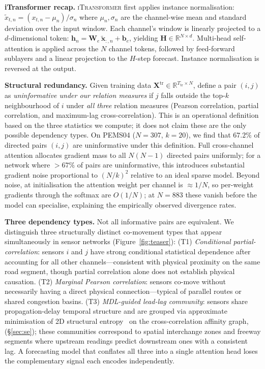 \documentclass[letterpaper]{article}   %
\newcommand{\itrans}{\textsc{iTransformer}}
\begin{document}
\textbf{iTransformer recap.}
\itrans{} \cite{liu2023itransformer} first applies instance normalisation:
$\tilde{x}_{t,n}{=}(x_{t,n}-\mu_n)/\sigma_n$ where $\mu_n,\sigma_n$ are the
channel-wise mean and standard deviation over the input window.
Each channel's window is linearly projected to a $d$-dimensional token:
$\mathbf{h}_n=\mathbf{W}_e\,\tilde{\mathbf{x}}_{:,n}+\mathbf{b}_e$,
yielding $\mathbf{H}\in\mathbb{R}^{N\times d}$.
Multi-head self-attention is applied across the $N$ channel tokens, followed by
feed-forward sublayers and a linear projection to the $H$-step forecast.
Instance normalisation is reversed at the output.

\textbf{Structural redundancy.}
Given training data $\mathbf{X}^{\text{tr}}\in\mathbb{R}^{T_{\text{tr}}\times N}$,
define a pair $(i,j)$ as \emph{uninformative under our relation measures} if $j$ falls outside the
top-$k$ neighbourhood of $i$ under \emph{all three} relation measures
(Pearson correlation, partial correlation, and maximum-lag cross-correlation).
This is an operational definition based on the three statistics we compute; it does not
claim these are the only possible dependency types.
On PEMS04 ($N{=}307$, $k{=}20$), we find that $67.2\%$ of directed pairs
$(i,j)$ are uninformative under this definition.
Full cross-channel attention allocates gradient mass to all $N(N-1)$ directed pairs
uniformly; for a network where $>67\%$ of pairs are uninformative, this introduces
substantial gradient noise proportional to $(N/k)^2$ relative to an ideal sparse model.
Beyond noise, at initialisation the attention weight per channel is $\approx 1/N$,
so per-weight gradients through the softmax are $O(1/N)$; at $N{=}883$ these vanish
before the model can specialise, explaining the empirically observed divergence rates.

\textbf{Three dependency types.}
Not all informative pairs are equivalent.
We distinguish three structurally distinct co-movement types that appear simultaneously
in sensor networks (Figure~\ref{fig:teaser}):
(T1) \emph{Conditional partial-correlation}: sensors $i$ and $j$ have strong conditional statistical
  dependence after accounting for all other channels---consistent with physical proximity
  on the same road segment, though partial correlation alone does not establish physical causation.
(T2) \emph{Marginal Pearson correlation}: sensors co-move without necessarily having
  a direct physical connection---typical of parallel routes or shared congestion basins.
(T3) \emph{MDL-guided lead-lag community}: sensors share propagation-delay temporal
  structure and are grouped via approximate minimisation of 2D structural entropy~\cite{li2016structural}
  on the cross-correlation affinity graph,
  (§\ref{sec:se}); these communities correspond to spatial interchange zones and
  freeway segments where upstream readings predict downstream ones with a consistent lag.
A forecasting model that conflates all three into a single attention head loses the
complementary signal each encodes independently.
\end{document}
